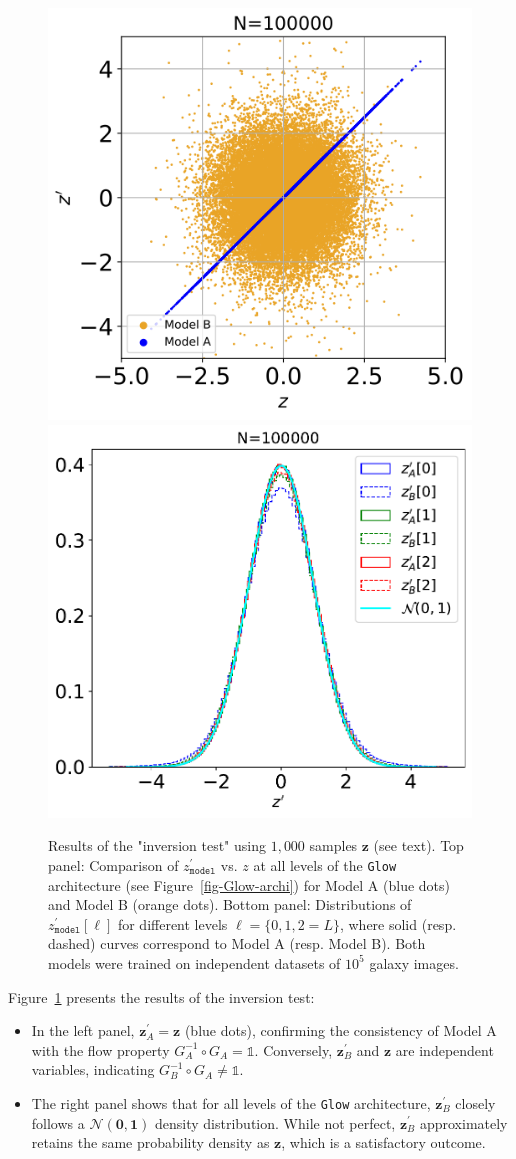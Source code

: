 \documentclass[fleqn,usenatbib]{mnras}
\begin{document}
\begin{figure}
    \centering
    \includegraphics[width=0.7\linewidth]{fig-glow_100000_test_inversibility_AB_2.png}\\
    \includegraphics[width=0.6\linewidth]{fig-glow_100000_test_inversibility_AB_blocks.pdf}
    \caption{Results of the "inversion test" using $1,000$ samples $\bm{z}$ (see text). 
    Top panel: Comparison of $z^\prime_{\texttt{model}}$ vs. $z$ at all levels of the \texttt{Glow} architecture (see Figure~\ref{fig-Glow-archi}) for Model A (blue dots) and Model B (orange dots). 
    Bottom panel: Distributions of $z^\prime_{\texttt{model}}[\ell]$ for different levels $\ell = \{0, 1, 2 = L\}$, where solid (resp. dashed) curves correspond to Model A (resp. Model B). Both models were trained on independent datasets of $10^5$ galaxy images.}
    \label{fig-glow-inversibility}
\end{figure}
Figure~\ref{fig-glow-inversibility} presents the results of the inversion test:
\begin{itemize}
    \item In the left panel, $\bm{z}_A^\prime = \bm{z}$ (blue dots), confirming the consistency of Model A with the flow property $G_A^{-1} \circ G_A = \mathds{1}$. Conversely, $\bm{z}_B^\prime$ and $\bm{z}$ are independent variables, indicating $G_B^{-1} \circ G_A \neq \mathds{1}$.
    \item The right panel shows that for all levels of the \texttt{Glow} architecture, $\bm{z}_B^\prime$ closely follows a $\mathcal{N}(\bm{0}, \bm{1})$ density distribution. While not perfect, $\bm{z}_B^\prime$ approximately retains the same probability density as $\bm{z}$, which is a satisfactory outcome.
\end{itemize}
\end{document}
